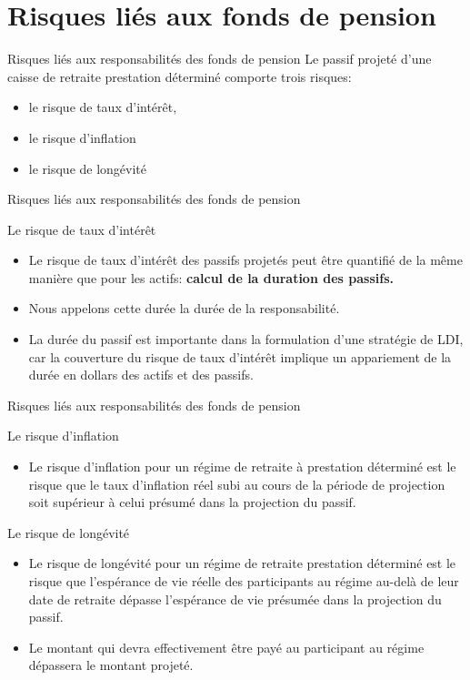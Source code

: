 \documentclass[10pt,a4paper]{beamer}
\begin{document}
\section{Risques liés aux fonds de pension}

\begin{frame}{Risques liés aux responsabilités des fonds de pension}
Le passif projeté d’une caisse de retraite prestation déterminé comporte trois risques:
\begin{itemize}[label=\bullet]
\item le risque de taux d’intérêt,
\item le risque d’inflation 
\item le risque de longévité
\end{itemize}
\end{frame}

\begin{frame}{Risques liés aux responsabilités des fonds de pension}
\begin{block}{Le risque de taux d’intérêt}
\begin{itemize}[label=\bullet]
\item Le risque de taux d'intérêt des passifs projetés peut être quantifié de la même manière que pour les actifs: \textbf{calcul de la duration des passifs.} 
\item Nous appelons cette durée la durée de la responsabilité.
\item La durée du passif est importante dans la formulation d'une stratégie de LDI, car la couverture du risque de taux d'intérêt implique un appariement de la durée en dollars des actifs et des passifs.
\end{itemize}
\end{block}
\end{frame}

\begin{frame}{Risques liés aux responsabilités des fonds de pension}
\begin{block}{Le risque d'inflation}
\begin{itemize}[label=\bullet]
\item Le risque d'inflation pour un régime de retraite à prestation déterminé est le risque que le taux d'inflation réel subi au cours de la période de projection soit supérieur à celui présumé dans la projection du passif.
\end{itemize}
\end{block}
\begin{block}{Le risque de longévité}
\begin{itemize}[label=\bullet]
\item Le risque de longévité pour un régime de retraite prestation déterminé est le risque que l'espérance de vie réelle des participants au régime au-delà de leur date de retraite dépasse l'espérance de vie présumée dans la projection du passif.
\item Le montant qui devra effectivement être payé au participant au régime dépassera le montant projeté.
\end{itemize}
\end{block}
\end{frame}
\end{document}
